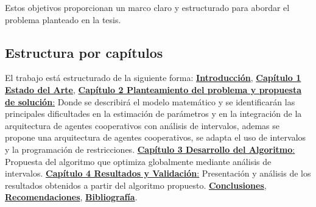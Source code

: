 Estos objetivos proporcionan un marco claro y estructurado para abordar el problema planteado en la tesis.

\subsection*{Estructura por capítulos}

El trabajo está estructurado de la siguiente forma: \hyperref[sec:12]{ \textbf{Introducción}}, \hyperref[sec:13]{ \textbf{Capítulo 1 Estado del Arte}},
\hyperref[sec:14]{ \textbf{Capítulo 2 Planteamiento del problema y propuesta de solución}:} Donde se describirá el modelo matemático y se identificarán las principales dificultades
en la estimación de parámetros y en la integración de la arquitectura de agentes cooperativos con análisis de intervalos, ademas se propone una arquitectura de agentes cooperativos, se adapta el uso de intervalos y la programación de restricciones. \hyperref[sec:16]{ \textbf{Capítulo 3 Desarrollo del Algoritmo}:}
Propuesta del algoritmo que optimiza globalmente mediante análisis de intervalos. \hyperref[sec:17]{ \textbf{Capítulo 4 Resultados y Validación}:} Presentación y
análisis de los resultados obtenidos a partir del algoritmo propuesto. \hyperref[sec:18]{\textbf{Conclusiones}}, \hyperref[sec:20]{\textbf{Recomendaciones}}, \hyperref[sec:21]{ \textbf{Bibliografía}}.